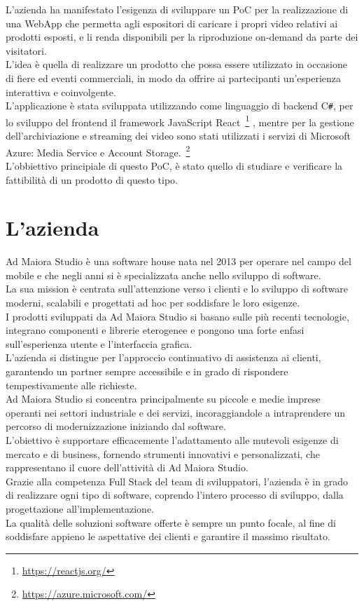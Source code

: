 L'azienda ha manifestato l'esigenza di sviluppare un PoC per la realizzazione di una WebApp che permetta agli espositori di caricare i propri video relativi ai prodotti esposti, e li renda disponibili per la riproduzione on-demand da parte dei visitatori.\\
L'idea è quella di realizzare un prodotto che possa essere utilizzato in occasione di fiere ed eventi commerciali, in modo da offrire ai partecipanti un'esperienza interattiva e coinvolgente.\\
L'applicazione è stata sviluppata utilizzando come linguaggio di backend C\texttt{\#}, per lo sviluppo del frontend il framework JavaScript React~\footnote{\url{https://reactjs.org/}}  ,
mentre per la gestione dell'archiviazione e streaming dei video sono stati utilizzati i servizi di Microsoft Azure: Media Service e Account Storage.~\footnote{\url{https://azure.microsoft.com/}}\\
L'obbiettivo principiale di questo PoC, è stato quello di studiare e verificare la fattibilità di un prodotto di questo tipo.\\
\section{L'azienda}

Ad Maiora Studio è una software house nata nel 2013 per operare nel campo del mobile e che negli anni si è specializzata anche nello sviluppo di software.\\
La sua mission è centrata sull'attenzione verso i clienti e lo sviluppo di software moderni, scalabili e progettati ad hoc per soddisfare le loro esigenze. \\
I prodotti sviluppati da Ad Maiora Studio si basano sulle più recenti tecnologie, integrano componenti e librerie eterogenee e pongono una forte enfasi sull'esperienza utente
 e l'interfaccia grafica.\\
L'azienda si distingue per l'approccio continuativo di assistenza ai clienti, 
garantendo un partner sempre accessibile e in grado di rispondere tempestivamente alle richieste. \\
Ad Maiora Studio si concentra principalmente su piccole e medie imprese operanti nei settori industriale e dei servizi, incoraggiandole a intraprendere un percorso di modernizzazione
 iniziando dal software.\\
L'obiettivo è supportare efficacemente l'adattamento alle mutevoli esigenze di mercato e di business, fornendo strumenti innovativi e personalizzati, che rappresentano il cuore dell'attività di Ad Maiora Studio.\\
Grazie alla competenza Full Stack del team di sviluppatori, l'azienda è in grado di realizzare ogni tipo di software, 
coprendo l'intero processo di sviluppo, dalla progettazione all'implementazione.\\
La qualità delle soluzioni software offerte è sempre un punto focale, al fine di soddisfare appieno le aspettative dei clienti e garantire il massimo risultato.



